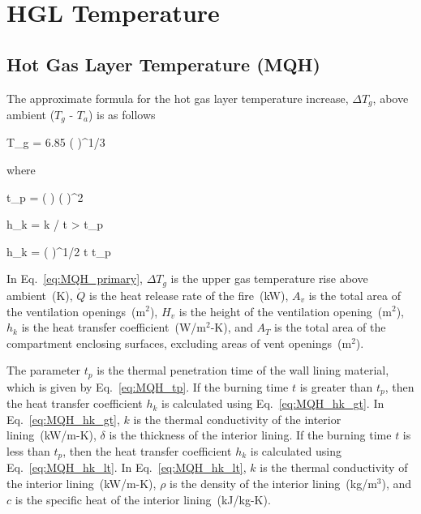 \chapter{HGL Temperature}
\label{HGL:Chapter}

\section{Hot Gas Layer Temperature (MQH)}

The approximate formula for the hot gas layer temperature increase, $\Delta T_g$, above ambient ($T_g$ - $T_a$) is as follows

\be
\Delta T_g = 6.85 \left(  \right)^{1/3}
\label{eq:MQH_primary}
\ee

\noindent where

\be
t_p = \left(  \right) \left(  \right)^2
\label{eq:MQH_tp}
\ee

\be
h_k = k / \delta {} t > t_p
\label{eq:MQH_hk_gt}
\ee

\be
h_k = \left(  \right)^{1/2}  t \le t_p
\label{eq:MQH_hk_lt}
\ee

In Eq.~\ref{eq:MQH_primary}, $\Delta T_g$ is the upper gas temperature rise above ambient~(K), $\dot Q$ is the heat release rate of the fire~(kW), $A_v$ is the total area of the ventilation openings~(m$^2$), $H_v$ is the height of the ventilation opening~(m$^2$), $h_k$ is the heat transfer coefficient~(W/m$^2$-K), and $A_T$ is the total area of the compartment enclosing surfaces, excluding areas of vent openings~(m$^2$). 

The parameter $t_p$ is the thermal penetration time of the wall lining material, which is given by Eq.~\ref{eq:MQH_tp}. If the burning time $t$ is greater than $t_p$, then the heat transfer coefficient $h_k$ is calculated using Eq.~\ref{eq:MQH_hk_gt}. In Eq.~\ref{eq:MQH_hk_gt}, $k$ is the thermal conductivity of the interior lining~(kW/m-K), $\delta$ is the thickness of the interior lining. If the burning time $t$ is less than $t_p$, then the heat transfer coefficient $h_k$ is calculated using Eq.~\ref{eq:MQH_hk_lt}. In Eq.~\ref{eq:MQH_hk_lt}, $k$ is the thermal conductivity of the interior lining~(kW/m-K), $\rho$ is the density of the interior lining~(kg/m$^3$), and $c$ is the specific heat of the interior lining~(kJ/kg-K).

%
%
%
%

